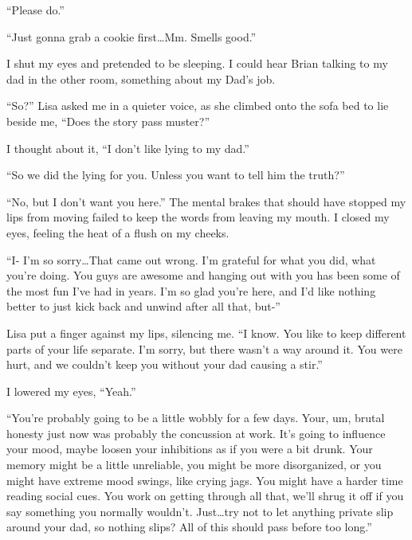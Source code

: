 ``Please do.''



``Just gonna grab a cookie first\ldots Mm.  Smells good.''



I shut my eyes and pretended to be sleeping.  I could hear Brian talking to my dad in the other room, something about my Dad's job.



``So?'' Lisa asked me in a quieter voice, as she climbed onto the sofa bed to lie beside me, ``Does the story pass muster?''



I thought about it, ``I don't like lying to my dad.''



``So we did the lying for you.  Unless you want to tell him the truth?''



``No, but I don't want you here.''  The mental brakes that should have stopped my lips from moving failed to keep the words from leaving my mouth.  I closed my eyes, feeling the heat of a flush on my cheeks.



``I- I'm so sorry\ldots That came out wrong.  I'm grateful for what you did, what you're doing.  You guys are awesome and hanging out with you has been some of the most fun I've had in years.  I'm so glad you're here, and I'd like nothing better to just kick back and unwind after all that, but-''



Lisa put a finger against my lips, silencing me.  ``I know.  You like to keep different parts of your life separate.  I'm sorry, but there wasn't a way around it.  You were hurt, and we couldn't keep you without your dad causing a stir.''



I lowered my eyes, ``Yeah.''



``You're probably going to be a little wobbly for a few days.  Your, um, brutal honesty just now was probably the concussion at work.  It's going to influence your mood, maybe loosen your inhibitions as if you were a bit drunk.  Your memory might be a little unreliable, you might be more disorganized, or you might have extreme mood swings, like crying jags.  You might have a harder time reading social cues.  You work on getting through all that, we'll shrug it off if you say something you normally wouldn't.  Just\ldots try not to let anything private slip around your dad, so nothing slips?  All of this should pass before too long.''



